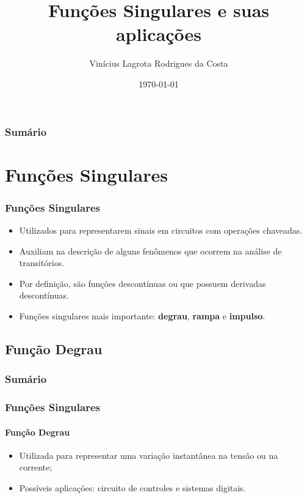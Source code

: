 \documentclass[mathserif]{beamer}
\title[Funções Singulares]{Funções Singulares e suas aplicações}
\author[Vinícius Lagrota]{Vinícius Lagrota Rodrigues da Costa}
\institute[CES]{Centro de Ensino Superior de Juiz de Fora}
\date{\today}
\begin{document}
\begin{frame}
\maketitle 
\end{frame}

\begin{frame}
\frametitle{Sumário}
\tableofcontents
\end{frame}

\section{Funções Singulares}
\begin{frame}
\frametitle{Funções Singulares}
\begin{itemize}
	\item Utilizados para representarem sinais em circuitos com operações chaveadas.
	\item Auxiliam na descrição de alguns fenômenos que ocorrem na análise de transitórios.
	\item Por definição, são funções descontínuas ou que possuem derivadas descontínuas.
	\item Funções singulares mais importante: \textbf{degrau}, \textbf{rampa} e \textbf{impulso}. 
\end{itemize}
\end{frame}

	
\subsection{Função Degrau}
\begin{frame}
	\frametitle{Sumário}
	\small
	\tableofcontents[currentsubsection]
\end{frame}
\begin{frame}
\frametitle{Funções Singulares}
\framesubtitle{Função Degrau}
	\begin{itemize}
		\item Utilizada para representar uma variação instantânea na tensão ou na corrente;
		\vfill
		\item Possíveis aplicações: circuito de controles e sistemas digitais.
	\end{itemize}
	
\end{frame}
\end{document}
